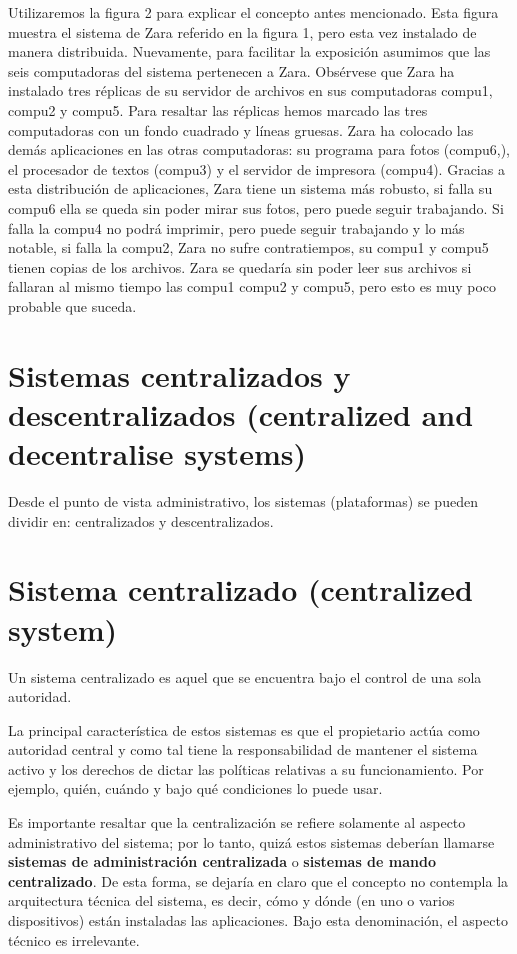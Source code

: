 \documentclass[12pt]{report} %
\begin{document}
\begin{itemize}
Utilizaremos la figura 2 para explicar el concepto antes mencionado. Esta figura muestra el sistema de Zara referido en la figura 1, pero esta vez instalado de manera distribuida. Nuevamente, para facilitar la exposición asumimos que las seis computadoras del sistema pertenecen a Zara. Obsérvese que Zara ha instalado tres réplicas de su servidor de archivos en sus computadoras compu1, compu2 y compu5. Para resaltar las réplicas hemos marcado las tres computadoras con un fondo cuadrado y líneas gruesas. Zara ha colocado las demás aplicaciones en las otras computadoras: su programa para fotos (compu6,), el procesador de textos (compu3) y el servidor de impresora (compu4). Gracias a esta distribución de aplicaciones, Zara tiene un sistema más robusto, si falla su compu6 ella se queda sin poder mirar sus fotos, pero puede seguir trabajando. Si falla la compu4 no podrá imprimir, pero puede seguir trabajando y lo más notable, si falla la compu2, Zara no sufre contratiempos, su compu1 y compu5 tienen copias de los archivos. Zara se quedaría sin poder leer sus archivos si fallaran al mismo tiempo las compu1 compu2 y compu5, pero esto es muy poco probable que suceda. 

\section{Sistemas centralizados y descentralizados \textbf{(centralized and decentralise systems)}}

Desde el punto de vista administrativo, los sistemas (plataformas) se pueden dividir en: centralizados y descentralizados.

\section{Sistema centralizado (centralized system)}

Un sistema centralizado es aquel que se encuentra bajo el control de una sola autoridad.

La principal característica de estos sistemas es que el propietario actúa como autoridad central y como tal tiene la responsabilidad de mantener el sistema activo y los derechos de dictar las políticas relativas a su funcionamiento. Por ejemplo, quién, cuándo y bajo qué condiciones lo puede usar.

Es importante resaltar que la centralización se refiere solamente al aspecto administrativo del sistema; por lo tanto, quizá estos sistemas deberían llamarse \textbf{sistemas de administración centralizada} o \textbf{sistemas de mando centralizado}. De esta forma, se dejaría en claro que el concepto no contempla la arquitectura técnica del sistema, es decir, cómo y dónde (en uno o varios dispositivos) están instaladas las aplicaciones. Bajo esta denominación, el aspecto técnico es irrelevante. 


\end{itemize}
\end{document}
